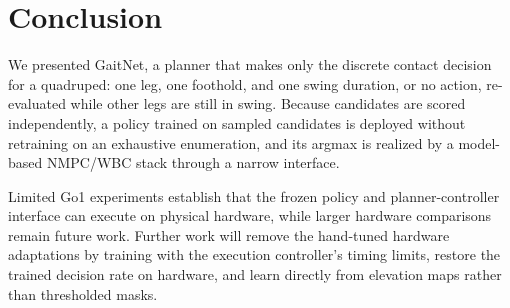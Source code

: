 \section{Conclusion}
\label{sec:conclusion}

We presented GaitNet, a planner that makes only the discrete contact
decision for a quadruped: one leg, one foothold, and one swing
duration, or no action, re-evaluated while other legs are still in
swing. Because candidates are scored independently, a policy trained
on sampled candidates is deployed without retraining on an exhaustive
enumeration, and its argmax is realized by a model-based NMPC/WBC
stack through a narrow interface.

 Limited Go1 experiments
establish that the frozen policy and planner-controller interface can
execute on physical hardware, while larger hardware comparisons remain
future work. Further work will remove the hand-tuned hardware
adaptations by training with the execution controller's timing limits,
restore the trained decision rate on hardware, and learn directly from
elevation maps rather than thresholded masks.
